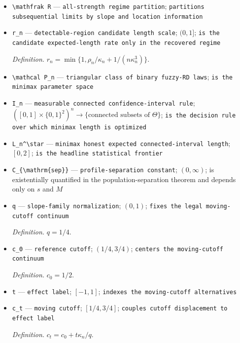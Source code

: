 \documentclass{article}
\begin{document}
\begin{itemize}
  \item \texttt{\textbackslash{}\allowbreak{}mathfrak R} --- \texttt{all-\allowbreak{}strength regime partition}; \texttt{partitions subsequential limits by slope and location information}
  \item \texttt{r\_\allowbreak{}n} --- \texttt{detectable-\allowbreak{}region candidate length scale}; \((0,1]\); \texttt{is the candidate expected-\allowbreak{}length rate only in the recovered regime}
  \par\smallskip\noindent\emph{Definition.} \(r_n=\min\{1,\rho_n/\kappa_n+1/(n\kappa_n^3)\}\).
  \item \texttt{\textbackslash{}\allowbreak{}mathcal P\_\allowbreak{}n} --- \texttt{triangular class of binary fuzzy-\allowbreak{}RD laws}; \texttt{is the minimax parameter space}
  \item \texttt{I\_\allowbreak{}n} --- \texttt{measurable connected confidence-\allowbreak{}interval rule}; \(([0,1]\times\{0,1\}^2)^n\to\{\text{connected subsets of }\Theta\}\); \texttt{is the decision rule over which minimax length is optimized}
  \item \texttt{L\_\allowbreak{}n\textasciicircum{}\textbackslash{}\allowbreak{}star} --- \texttt{minimax honest expected connected-\allowbreak{}interval length}; \([0,2]\); \texttt{is the headline statistical frontier}
  \item \texttt{C\_\allowbreak{}\{\textbackslash{}\allowbreak{}mathrm\{sep\}\allowbreak{}\}\allowbreak{}} --- \texttt{profile-\allowbreak{}separation constant}; \((0,\infty)\); is existentially quantified in the population-separation theorem and depends only on \(s\) and \(M\)
  \item \texttt{q} --- \texttt{slope-\allowbreak{}family normalization}; \((0,1)\); \texttt{fixes the legal moving-\allowbreak{}cutoff continuum}
  \par\smallskip\noindent\emph{Definition.} \(q=1/4\).
  \item \texttt{c\_\allowbreak{}0} --- \texttt{reference cutoff}; \((1/4,3/4)\); \texttt{centers the moving-\allowbreak{}cutoff continuum}
  \par\smallskip\noindent\emph{Definition.} \(c_0=1/2\).
  \item \texttt{t} --- \texttt{effect label}; \([-1,1]\); \texttt{indexes the moving-\allowbreak{}cutoff alternatives}
  \item \texttt{c\_\allowbreak{}t} --- \texttt{moving cutoff}; \([1/4,3/4]\); \texttt{couples cutoff displacement to effect label}
  \par\smallskip\noindent\emph{Definition.} \(c_t=c_0+t\kappa_n/q\).

\end{itemize}
\end{document}
